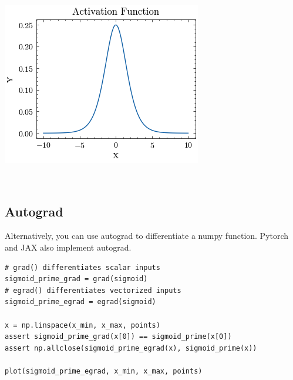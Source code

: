 \documentclass[openany]{book}
\begin{document}
    \begin{center}
    \includegraphics[width=\textwidth]{combined_files/combined_73_0.png}
    \end{center}
    { \hspace*{\fill} \\}
    
    \subsection{Autograd}\label{autograd}

Alternatively, you can use autograd to differentiate a numpy function.
Pytorch and JAX also implement autograd.

\begin{tcolorbox}
\tiny
\begin{verbatim}
# grad() differentiates scalar inputs
sigmoid_prime_grad = grad(sigmoid)
# egrad() differentiates vectorized inputs
sigmoid_prime_egrad = egrad(sigmoid)

x = np.linspace(x_min, x_max, points)
assert sigmoid_prime_grad(x[0]) == sigmoid_prime(x[0])
assert np.allclose(sigmoid_prime_egrad(x), sigmoid_prime(x))

plot(sigmoid_prime_egrad, x_min, x_max, points)
\end{verbatim}
\end{tcolorbox}
\end{document}
